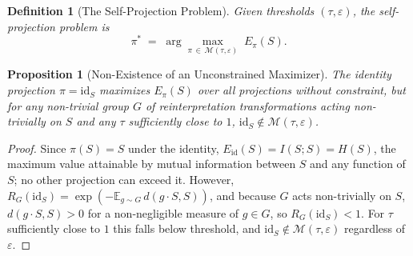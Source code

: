 \documentclass[11pt]{article}
\theoremstyle{plain}
\newtheorem{definition}{Definition}[section]
\newtheorem{proposition}{Proposition}[section]
\begin{document}
\begin{definition}[The Self-Projection Problem]
Given thresholds $(\tau,\varepsilon)$, the self-projection problem is
\[
\pi^\ast \;=\; \arg\max_{\pi \,\in\, \mathcal{M}(\tau,\varepsilon)} \; E_\pi(S).
\]
\end{definition}

\begin{proposition}[Non-Existence of an Unconstrained Maximizer]
The identity projection $\pi = \mathrm{id}_S$ maximizes $E_\pi(S)$ over all projections without constraint, but for any non-trivial group $G$ of reinterpretation transformations acting non-trivially on $S$ and any $\tau$ sufficiently close to $1$, $\mathrm{id}_S \notin \mathcal{M}(\tau,\varepsilon)$.
\end{proposition}
\begin{proof}
Since $\pi(S) = S$ under the identity, $E_{\mathrm{id}}(S) = I(S;S) = H(S)$, the maximum value attainable by mutual information between $S$ and any function of $S$; no other projection can exceed it. However, $R_G(\mathrm{id}_S) = \exp(-\mathbb{E}_{g\sim G}\, d(g\cdot S, S))$, and because $G$ acts non-trivially on $S$, $d(g\cdot S,S) > 0$ for a non-negligible measure of $g \in G$, so $R_G(\mathrm{id}_S) < 1$. For $\tau$ sufficiently close to $1$ this falls below threshold, and $\mathrm{id}_S \notin \mathcal{M}(\tau,\varepsilon)$ regardless of $\varepsilon$.
\end{proof}
\end{document}
